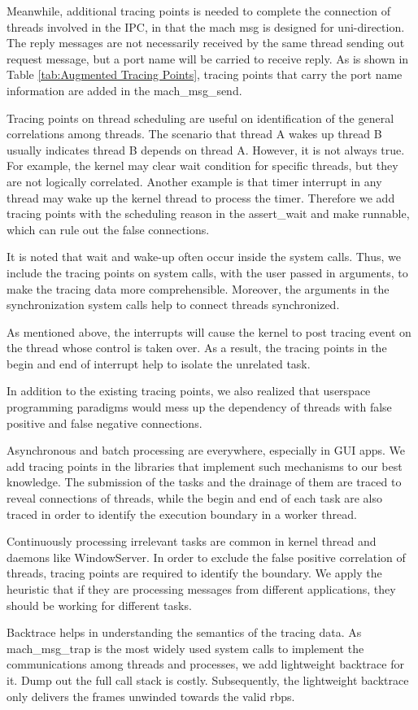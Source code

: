Meanwhile, additional tracing points is needed to complete the connection of threads involved in the IPC,
in that the mach msg is designed for uni-direction.
The reply messages are not necessarily received by the same thread sending out request message, but a port name will be carried to receive reply.
As is shown in Table \ref{tab:Augmented Tracing Points}, tracing points that carry the port name information are added in the mach\_msg\_send.\par
Tracing points on thread scheduling are useful on identification of the general correlations among threads.
The scenario that thread A wakes up thread B usually indicates thread B depends on thread A.
However, it is not always true.
For example, the kernel may clear wait condition for specific threads, but they are not logically correlated.
Another example is that timer interrupt in any thread may wake up the kernel thread to process the timer.
Therefore we add tracing points with the scheduling reason in the assert\_wait and make runnable, which can rule out the false connections.\par
It is noted that wait and wake-up often occur inside the system calls.
Thus, we include the tracing points on system calls, with the user passed in arguments, to make the tracing data more comprehensible.
Moreover, the arguments in the synchronization system calls help to connect threads synchronized.\par
As mentioned above, the interrupts will cause the kernel to post tracing event on the thread whose control is taken over.
As a result, the tracing points in the begin and end of interrupt help to isolate the unrelated task.\par
In addition to the existing tracing points, we also realized that userspace programming paradigms would mess up the dependency of threads with false positive and false negative connections.\par
Asynchronous and batch processing are everywhere, especially in GUI apps.
We add tracing points in the libraries that implement such mechanisms to our best knowledge.
The submission of the tasks and the drainage of them are traced to reveal connections of threads,
while the begin and end of each task are also traced in order to identify the execution boundary in a worker thread.\par
Continuously processing irrelevant tasks are common in kernel thread and daemons like WindowServer.
In order to exclude the false positive correlation of threads, tracing points are required to identify the boundary.
We apply the heuristic that if they are processing messages from different applications, they should be working for different tasks. \par
Backtrace helps in understanding the semantics of the tracing data.
As mach\_msg\_trap is the most widely used system calls to implement the communications among threads and processes, we add lightweight backtrace for it.
Dump out the full call stack is costly.
Subsequently, the lightweight backtrace only delivers the frames unwinded towards the valid rbps.\par
